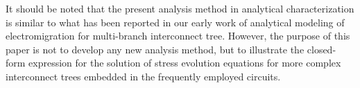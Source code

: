 It should be noted that the present analysis method in analytical characterization is similar to what has been reported in our early work of analytical modeling of electromigration for multi-branch interconnect tree. However, the purpose of this paper is not to develop any new analysis method, but to illustrate the closed-form expression for the solution of stress evolution equations for more complex interconnect trees embedded in the frequently employed circuits.
 






